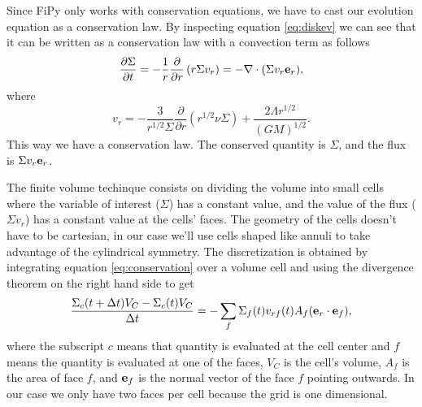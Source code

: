 \documentclass{article}
\begin{document}
Since FiPy only works with conservation equations, we have to cast our evolution equation as a conservation law.
By inspecting equation \ref{eq:diskev} we can see that it can be written as a conservation law with a convection 
term as follows
\begin{equation} \label{eq:conservation}
\frac{\partial \Sigma}{\partial t} = -\frac{1}{r} \frac{\partial}{\partial r} \left( r \Sigma v_{r}\right)=-\nabla\cdot (\Sigma v_r \bold{e}_{r}),
\end{equation}
where
\begin{equation} \label{eq:vr}
v_r = -\frac{3}{r^{1/2}\Sigma} \frac{\partial}{\partial r} \left(r^{1/2} \nu \Sigma\right) + \frac{2 \Lambda r^{1/2}}{(G M)^{1/2}}.
\end{equation}
This way we have a conservation law. The conserved quantity is $\Sigma$, and the flux is $\Sigma v_r \bold{e}_r$.

The finite volume techinque consists on dividing the volume into small cells where the variable of interest ($\Sigma$) has a constant value,
and the value of the flux ($\Sigma v_r$) has a constant value at the cells' faces. The geometry of the cells doesn't have to be cartesian, in
our case we'll use cells shaped like annuli to take advantage of the cylindrical symmetry.
The discretization is obtained by integrating equation \ref{eq:conservation} over a volume cell and using the divergence theorem on the
right hand side to get
\begin{equation} \label{eq:discretization}
\frac{\Sigma_c(t+\Delta t) V_C - \Sigma_c(t) V_C}{\Delta t} =
-\sum_{f} \Sigma_{f}(t) v_{rf}(t) A_{f} (\bold{e}_r \cdot \bold{e}_{f}),
\end{equation}
where the subscript $c$ means that quantity is evaluated at the cell center and $f$ means the quantity is evaluated at one of the faces,
$V_C$ is the cell's volume, $A_f$ is the area of face $f$, and $\bold{e}_{f}$ is the normal vector of the face $f$ pointing outwards.
In our case we only have two faces per cell because the grid is one 
dimensional.
\end{document}
